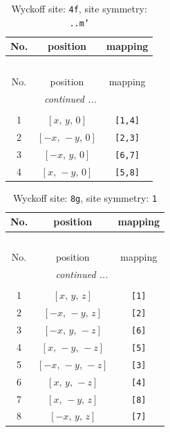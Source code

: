 \documentclass[fleqn,8pt]{jsarticle}
\begin{document}
\begin{longtable}{ccc}
\caption{Wyckoff site: {\tt 4f}, site symmetry: {\tt ..m'}}
 \\
 \hline \hline
No. & position & mapping \\ \hline \endfirsthead

\multicolumn{2}{l}{\tablename\ \thetable{}} \\
 \hline \hline
No. & position & mapping \\ \hline \endhead

 \hline \hline
\multicolumn{2}{r}{\footnotesize\it continued ...} \\ \endfoot

 \hline \hline
\multicolumn{2}{r}{} \\ \endlastfoot

1 & $\left[ x,\, y,\, 0 \right]$ & {\tt [1,4]} \\ \hline
2 & $\left[ - x,\, - y,\, 0 \right]$ & {\tt [2,3]} \\ \hline
3 & $\left[ - x,\, y,\, 0 \right]$ & {\tt [6,7]} \\ \hline
4 & $\left[ x,\, - y,\, 0 \right]$ & {\tt [5,8]} \\
\end{longtable}
\renewcommand{\arraystretch}{1.2}
\begin{longtable}{ccc}
\caption{Wyckoff site: {\tt 8g}, site symmetry: {\tt 1}}
 \\
 \hline \hline
No. & position & mapping \\ \hline \endfirsthead

\multicolumn{2}{l}{\tablename\ \thetable{}} \\
 \hline \hline
No. & position & mapping \\ \hline \endhead

 \hline \hline
\multicolumn{2}{r}{\footnotesize\it continued ...} \\ \endfoot

 \hline \hline
\multicolumn{2}{r}{} \\ \endlastfoot

1 & $\left[ x,\, y,\, z \right]$ & {\tt [1]} \\ \hline
2 & $\left[ - x,\, - y,\, z \right]$ & {\tt [2]} \\ \hline
3 & $\left[ - x,\, y,\, - z \right]$ & {\tt [6]} \\ \hline
4 & $\left[ x,\, - y,\, - z \right]$ & {\tt [5]} \\ \hline
5 & $\left[ - x,\, - y,\, - z \right]$ & {\tt [3]} \\ \hline
6 & $\left[ x,\, y,\, - z \right]$ & {\tt [4]} \\ \hline
7 & $\left[ x,\, - y,\, z \right]$ & {\tt [8]} \\ \hline
8 & $\left[ - x,\, y,\, z \right]$ & {\tt [7]} \\
\end{longtable}
\end{document}
